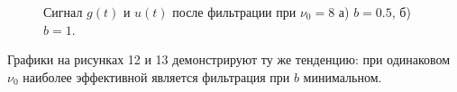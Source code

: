 \documentclass[a5paper, 10pt]{article}
\theoremstyle{definition}
\theoremstyle{plain}
\theoremstyle{remark}
\begin{document}
\begin{figure}[h!]
\begin{minipage}[h]{0.5\linewidth}
\end{minipage}
\hfill
\begin{minipage}[h]{0.5\linewidth}
\end{minipage}
\caption{Сигнал $g(t)$ и $u(t)$ после фильтрации при $\nu_0 = 8$ а) $b=0.5$, б) $b=1$.}
\end{figure}


\newpage
Графики на рисунках 12 и 13 демонстрируют ту же тенденцию: при одинаковом $\nu_0$ наиболее эффективной является фильтрация при $b$ минимальном.
\end{document}
